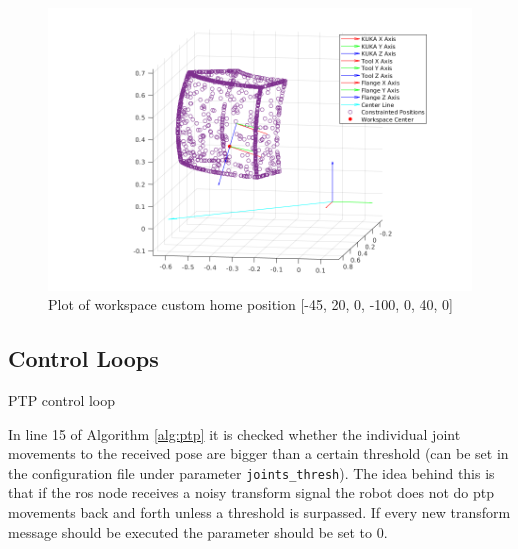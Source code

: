 \documentclass[headsepline,footinclude=false,fontsize=11pt,paper=a4,listof=totoc,bibliography=totoc,BCOR=12mm,DIV=14]{scrbook}
\begin{document}
\begin{figure}[h]
    \centering
    \includegraphics[width=15cm]{figures/ws_custom_home}
    \caption{Plot of workspace custom home position [-45, 20, 0, -100, 0, 40, 0]}
    \label{fig:custom_home}
\end{figure}

\newpage
\subsection{Control Loops}

\begin{algorithm}[H]
\caption{PTP control loop}
\label{alg:ptp}
\end{algorithm}

\vspace{0.8cm}
In line 15 of Algorithm \ref{alg:ptp} it is checked whether the individual joint movements to the received pose are bigger than a certain threshold (can be set in the configuration file under parameter \texttt{joints\_thresh}). The idea behind this is that if the \gls{ros} node receives a noisy transform signal the robot does not do \gls{ptp} movements back and forth unless a threshold is surpassed. If every new transform message should be executed the parameter should be set to 0.
\end{document}
